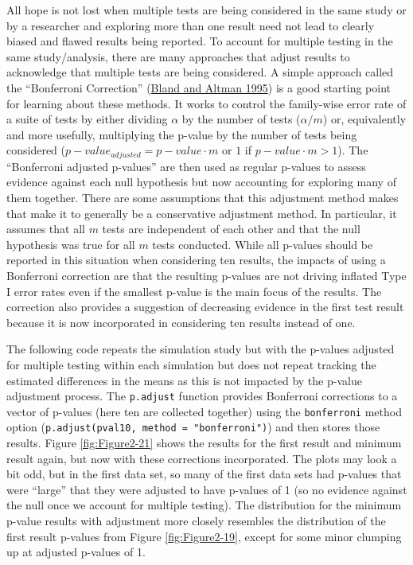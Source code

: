 \documentclass[
]{book}
\begin{document}
\indent All hope is not lost when multiple tests are being considered in the same study or by a researcher and exploring more than one result need not lead to clearly biased and flawed results being reported. To account for multiple testing in the same study/analysis, there are many approaches that adjust results to acknowledge that multiple tests are being considered. A simple approach called the ``Bonferroni Correction'' (\protect\hyperlink{ref-Bland1995}{Bland and Altman 1995}) is a good starting point for learning about these methods. It works to control the family-wise error rate of a suite of tests by either dividing \(\alpha\) by the number of tests (\(\alpha/m\)) or, equivalently and more usefully, multiplying the p-value by the number of tests being considered (\(p-value_{adjusted} = p-value \cdot m\) or \(1\) if \(p-value \cdot m > 1\)). The ``Bonferroni adjusted p-values'' are then used as regular p-values to assess evidence against each null hypothesis but now accounting for exploring many of them together. There are some assumptions that this adjustment method makes that make it to generally be a conservative adjustment method. In particular, it assumes that all \(m\) tests are independent of each other and that the null hypothesis was true for all \(m\) tests conducted. While all p-values should be reported in this situation when considering ten results, the impacts of using a Bonferroni correction are that the resulting p-values are not driving inflated Type I error rates even if the smallest p-value is the main focus of the results. The correction also provides a suggestion of decreasing evidence in the first test result because it is now incorporated in considering ten results instead of one.

\indent The following code repeats the simulation study but with the p-values adjusted for multiple testing within each simulation but does not repeat tracking the estimated differences in the means as this is not impacted by the p-value adjustment process. The \texttt{p.adjust} function provides Bonferroni corrections to a vector of p-values (here ten are collected together) using the \texttt{bonferroni} method option (\texttt{p.adjust(pval10,\ method\ =\ "bonferroni")}) and then stores those results. Figure \ref{fig:Figure2-21} shows the results for the first result and minimum result again, but now with these corrections incorporated. The plots may look a bit odd, but in the first data set, so many of the first data sets had p-values that were ``large'' that they were adjusted to have p-values of 1 (so no evidence against the null once we account for multiple testing). The distribution for the minimum p-value results with adjustment more closely resembles the distribution of the first result p-values from Figure \ref{fig:Figure2-19}, except for some minor clumping up at adjusted p-values of 1.
\end{document}
